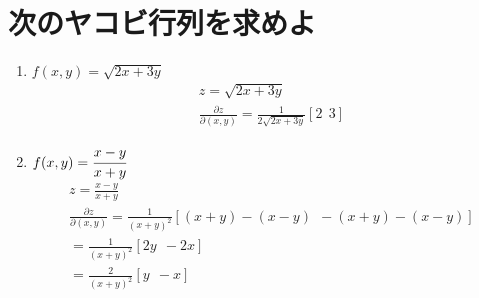 \documentclass[a4paper,10pt]{jarticle}
\begin{document}
\section{次のヤコビ行列を求めよ}
\begin{enumerate}
\item$f(x,y) = \sqrt{2x+3y}$ \begin{gather*}
	z = \sqrt{2x+3y} \\
	\frac{\partial z}{\partial(x,y)} = \frac{1}{2\sqrt{2x+3y}}[2 \ \ 3]
\end{gather*}
\item $f(x,y) = \cfrac{x-y}{x+y}$ \begin{gather*}
	z = \frac{x-y}{x+y}\\
	\frac{\partial z}{\partial(x,y)} =\frac{1}{(x+y)^2}\left[ (x+y)-(x-y) \ \ -(x+y)-(x-y)\right] \\
	=\frac{1}{(x+y)^2}\left[ 2y \ \ -2x\right] \\
	=\frac{2}{(x+y)^2}\left[ y \ \ -x\right]
\end{gather*}
\end{enumerate}

\end{document}
